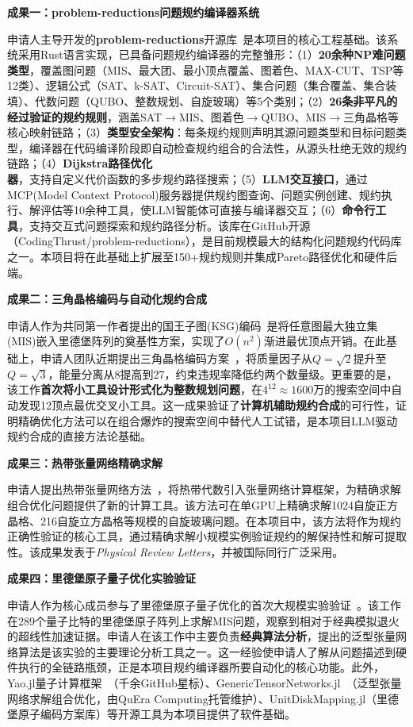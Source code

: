 \textbf{成果一：problem-reductions问题规约编译器系统}

申请人主导开发的\textbf{problem-reductions}开源库~\cite{ProblemReductions2025}是本项目的核心工程基础。该系统采用Rust语言实现，已具备问题规约编译器的完整雏形：（1）\textbf{20余种NP难问题类型}，覆盖图问题（MIS、最大团、最小顶点覆盖、图着色、MAX-CUT、TSP等12类）、逻辑公式（SAT、k-SAT、Circuit-SAT）、集合问题（集合覆盖、集合装填）、代数问题（QUBO、整数规划、自旋玻璃）等5个类别；（2）\textbf{26条非平凡的经过验证的规约规则}，涵盖SAT$\to$MIS、图着色$\to$QUBO、MIS$\to$三角晶格等核心映射链路；（3）\textbf{类型安全架构}：每条规约规则声明其源问题类型和目标问题类型，编译器在代码编译阶段即自动检查规约组合的合法性，从源头杜绝无效的规约链路；（4）\textbf{Dijkstra路径优化器}，支持自定义代价函数的多步规约路径搜索；（5）\textbf{LLM交互接口}，通过MCP(Model Context Protocol)服务器提供规约图查询、问题实例创建、规约执行、解评估等10余种工具，使LLM智能体可直接与编译器交互；（6）\textbf{命令行工具}，支持交互式问题探索和规约路径分析。该库在GitHub开源（CodingThrust/problem-reductions），是目前规模最大的结构化问题规约代码库之一。本项目将在此基础上扩展至150+规约规则并集成Pareto路径优化和硬件后端。

\textbf{成果二：三角晶格编码与自动化规约合成}

申请人作为共同第一作者提出的国王子图(KSG)编码~\cite{Nguyen2023PRXQuantum}是将任意图最大独立集(MIS)嵌入里德堡阵列的奠基性方案，实现了$O(n^2)$渐进最优顶点开销。在此基础上，申请人团队近期提出三角晶格编码方案~\cite{Pan2025Triangular}，将质量因子从$Q=\sqrt{2}$提升至$Q=\sqrt{3}$，能量分离从8提高到27，约束违规率降低约两个数量级。更重要的是，该工作\textbf{首次将小工具设计形式化为整数规划问题}，在$4^{12} \approx 1600$万的搜索空间中自动发现12顶点最优交叉小工具。这一成果验证了\textbf{计算机辅助规约合成}的可行性，证明精确优化方法可以在组合爆炸的搜索空间中替代人工试错，是本项目LLM驱动规约合成的直接方法论基础。

\textbf{成果三：热带张量网络精确求解}

申请人提出热带张量网络方法~\cite{Liu2021PRL}，将热带代数引入张量网络计算框架，为精确求解组合优化问题提供了新的计算工具。该方法可在单GPU上精确求解1024自旋正方晶格、216自旋立方晶格等规模的自旋玻璃问题。在本项目中，该方法将作为规约正确性验证的核心工具，通过精确求解小规模实例验证规约的解保持性和解可提取性。该成果发表于\emph{Physical Review Letters}，并被国际同行广泛采用。

\textbf{成果四：里德堡原子量子优化实验验证}

申请人作为核心成员参与了里德堡原子量子优化的首次大规模实验验证~\cite{Ebadi2022Science}。该工作在289个量子比特的里德堡原子阵列上求解MIS问题，观察到相对于经典模拟退火的超线性加速证据。申请人在该工作中主要负责\textbf{经典算法分析}，提出的泛型张量网络算法是该实验的主要理论分析工具之一。这一经验使申请人了解从问题描述到硬件执行的全链路瓶颈，正是本项目规约编译器所要自动化的核心功能。此外，Yao.jl量子计算框架~\cite{Luo2020Quantum}（千余GitHub星标）、GenericTensorNetworks.jl~\cite{Liu2023SIAM}（泛型张量网络求解组合优化，由QuEra Computing托管维护）、UnitDiskMapping.jl（里德堡原子编码方案库）等开源工具为本项目提供了软件基础。

